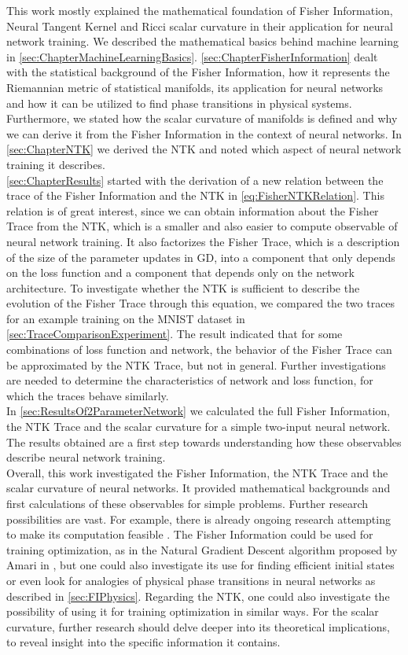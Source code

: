 This work mostly explained the mathematical foundation of Fisher Information, Neural Tangent Kernel and Ricci scalar curvature in their application for neural network training. We described the mathematical basics behind machine learning in \cref{sec:ChapterMachineLearningBasics}. \cref{sec:ChapterFisherInformation} dealt with the statistical background of the Fisher Information, how it represents the Riemannian metric of statistical manifolds, its application for neural networks and how it can be utilized to find phase transitions in physical systems. Furthermore, we stated how the scalar curvature of manifolds is defined and why we can derive it from the Fisher Information in the context of neural networks. In \cref{sec:ChapterNTK} we derived the NTK and noted which aspect of neural network training it describes.\\
\cref{sec:ChapterResults} started with the derivation of a new relation between the trace of the Fisher Information and the NTK in \cref{eq:FisherNTKRelation}. This relation is of great interest, since we can obtain information about the Fisher Trace from the NTK, which is a smaller and also easier to compute observable of neural network training. It also factorizes the Fisher Trace, which is a description of the size of the parameter updates in GD, into a component that only depends on the loss function and a component that depends only on the network architecture. To investigate whether the NTK is sufficient to describe the evolution of the Fisher Trace through this equation, we compared the two traces for an example training on the MNIST dataset in \cref{sec:TraceComparisonExperiment}. The result indicated that for some combinations of loss function and network, the behavior of the Fisher Trace can be approximated by the NTK Trace, but not in general. Further investigations are needed to determine the characteristics of network and loss function, for which the traces behave similarly.\\
In \cref{sec:ResultsOf2ParameterNetwork} we calculated the full Fisher Information, the NTK Trace and the scalar curvature for a simple two-input neural network. The results obtained are a first step towards understanding how these observables describe neural network training.\\
Overall, this work investigated the Fisher Information, the NTK Trace and the scalar curvature of neural networks. It provided mathematical backgrounds and first calculations of these observables for simple problems. Further research possibilities are vast. For example, there is already ongoing research attempting to make its computation feasible \cite{EfficientFisherResearch}. The Fisher Information could be used for training optimization, as in the Natural Gradient Descent algorithm proposed by Amari in \cite{NGDWorksEfficiently}, but one could also investigate its use for finding efficient initial states or even look for analogies of physical phase transitions in neural networks as described in \cref{sec:FIPhysics}. Regarding the NTK, one could also investigate the possibility of using it for training optimization in similar ways. For the scalar curvature, further research should delve deeper into its theoretical implications, to reveal insight into the specific information it contains. 
